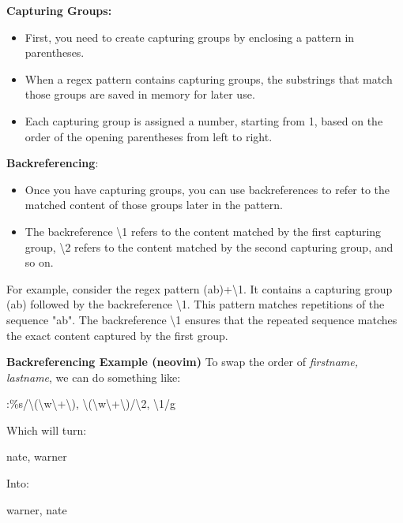 \documentclass{report}
\begin{document}
    \bigbreak \noindent 
    \textbf{Capturing Groups:}
    \begin{itemize}
        \item First, you need to create capturing groups by enclosing a pattern in parentheses.
        \item When a regex pattern contains capturing groups, the substrings that match those groups are saved in memory for later use.
        \item Each capturing group is assigned a number, starting from 1, based on the order of the opening parentheses from left to right.
    \end{itemize}
    \textbf{Backreferencing}:
    \begin{itemize}
        \item Once you have capturing groups, you can use backreferences to refer to the matched content of those groups later in the pattern.
        \item The backreference \textbackslash 1 refers to the content matched by the first capturing group, \textbackslash 2 refers to the content matched by the second capturing group, and so on.
    \end{itemize}
    For example, consider the regex pattern (ab)+\textbackslash 1. It contains a capturing group (ab) followed by the backreference \textbackslash 1. This pattern matches repetitions of the sequence "ab". The backreference \textbackslash 1 ensures that the repeated sequence matches the exact content captured by the first group.

    \bigbreak \noindent 
    \bigbreak \noindent 

    \bigbreak \noindent 
    \textbf{Backreferencing Example (neovim)}
    \bigbreak \noindent 
    To swap the order of \textit{firstname, lastname}, we can do something like:
    \begin{center}
        :\%s/\textbackslash(\textbackslash w\textbackslash +\textbackslash ), \textbackslash(\textbackslash w\textbackslash +\textbackslash )/\textbackslash 2, \textbackslash 1/g
    \end{center}
    Which will turn:
    \begin{center}
        nate, warner
    \end{center}
    Into:
    \begin{center}
        warner, nate
    \end{center}
\end{document}
